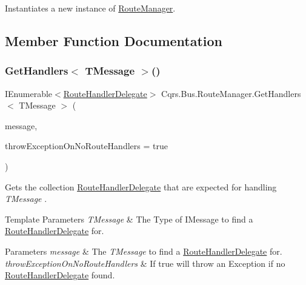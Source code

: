 Instantiates a new instance of \hyperlink{classCqrs_1_1Bus_1_1RouteManager}{Route\+Manager}. 



\subsection{Member Function Documentation}
\mbox{\label{classCqrs_1_1Bus_1_1RouteManager_a738be20bb4ad702f7689e2aad70a9dc5_a738be20bb4ad702f7689e2aad70a9dc5}} 
\subsubsection{\texorpdfstring{Get\+Handlers$<$ T\+Message $>$()}{GetHandlers< TMessage >()}}
{\footnotesize\ttfamily I\+Enumerable$<$\hyperlink{classCqrs_1_1Bus_1_1RouteHandlerDelegate}{Route\+Handler\+Delegate}$>$ Cqrs.\+Bus.\+Route\+Manager.\+Get\+Handlers$<$ T\+Message $>$ (\begin{DoxyParamCaption}\item[{T\+Message}]{message,  }\item[{bool}]{throw\+Exception\+On\+No\+Route\+Handlers = {\ttfamily true} }\end{DoxyParamCaption})}



Gets the collection \hyperlink{classCqrs_1_1Bus_1_1RouteHandlerDelegate}{Route\+Handler\+Delegate} that are expected for handling {\itshape T\+Message} . 


\begin{DoxyTemplParams}{Template Parameters}
{\em T\+Message} & The Type of I\+Message to find a \hyperlink{classCqrs_1_1Bus_1_1RouteHandlerDelegate}{Route\+Handler\+Delegate} for.\\
\hline
\end{DoxyTemplParams}

\begin{DoxyParams}{Parameters}
{\em message} & The {\itshape T\+Message}  to find a \hyperlink{classCqrs_1_1Bus_1_1RouteHandlerDelegate}{Route\+Handler\+Delegate} for. \\
\hline
{\em throw\+Exception\+On\+No\+Route\+Handlers} & If true will throw an Exception if no \hyperlink{classCqrs_1_1Bus_1_1RouteHandlerDelegate}{Route\+Handler\+Delegate} found.\\
\hline
\end{DoxyParams}


